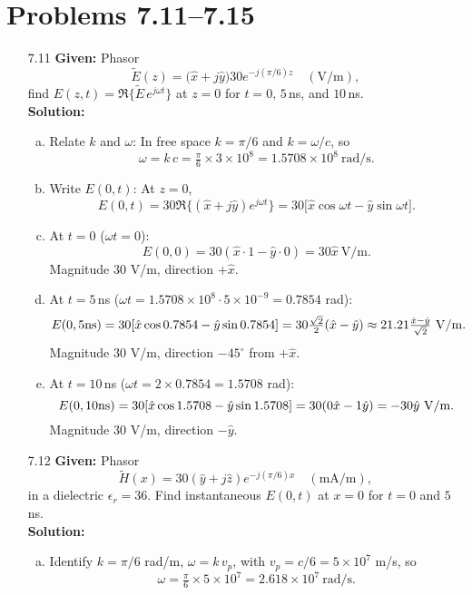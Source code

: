 \section*{Problems 7.11--7.15}
\begin{enumerate}

\item[7.11] \textbf{Given:} Phasor
\[\tilde E(z)=\bigl(\hat x + j\hat y\bigr)30e^{-j(\pi/6)z}\quad(\mathrm{V/m}),\]
find $E(z,t)=\Re\{\tilde E\,e^{j\omega t}\}$ at $z=0$ for $t=0,\,5\,$ns, and $10\,$ns.
\\
\textbf{Solution:}
\begin{enumerate}[(a)]
  \item Relate $k$ and $\omega$: In free space $k=\pi/6$ and $k=\omega/c$, so
  \[\omega = k\,c = \tfrac{\pi}{6}\times3\times10^8 = 1.5708\times10^8~\mathrm{rad/s}.\]

  \item Write $E(0,t)$: At $z=0$,
  \[E(0,t)=30\Re\{(\hat x+j\hat y)e^{j\omega t}\}
    =30\bigl[\hat x\cos\omega t - \hat y\sin\omega t\bigr].\]

  \item At $t=0$ ($\omega t=0$):
  \[E(0,0)=30(\hat x\cdot1 - \hat y\cdot0)=30\hat x~\mathrm{V/m}.\]
  Magnitude $30$ V/m, direction $+\hat x$.

  \item At $t=5\,$ns ($\omega t=1.5708\times10^8\cdot5\times10^{-9}=0.7854$ rad):
  \[E(0,5{\rm ns})=30[\hat x\cos0.7854 - \hat y\sin0.7854]
    =30\tfrac{\sqrt2}{2}(\hat x-\hat y)
    \approx21.21\tfrac{\hat x-\hat y}{\sqrt2}~\mathrm{V/m}.\]
  Magnitude $30$ V/m, direction $-45^\circ$ from $+\hat x$.

  \item At $t=10\,$ns ($\omega t=2\times0.7854=1.5708$ rad):
  \[E(0,10{\rm ns})=30[\hat x\cos1.5708 - \hat y\sin1.5708]
    =30(0\hat x -1\hat y)=-30\hat y~\mathrm{V/m}.\]
  Magnitude $30$ V/m, direction $-\hat y$.
\end{enumerate}

\item[7.12] \textbf{Given:} Phasor
\[\tilde H(x)=30(\hat y+j\hat z)e^{-j(\pi/6)x}\quad(\mathrm{mA/m}),\]
in a dielectric $\epsilon_r=36$.  Find instantaneous $E(0,t)$ at $x=0$ for $t=0$ and $5$ ns.
\\
\textbf{Solution:}
\begin{enumerate}[(a)]
  \item Identify $k=\pi/6$ rad/m, $\omega=k\,v_p$, with $v_p=c/6=5\times10^7$ m/s, so
  \[\omega=\tfrac{\pi}{6}\times5\times10^7=2.618\times10^7~\mathrm{rad/s}.\]


\end{enumerate}
\end{enumerate}
